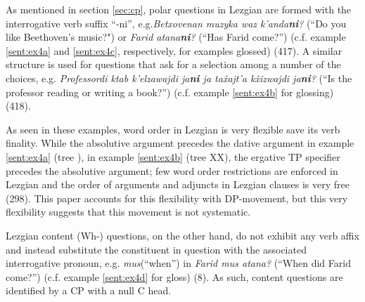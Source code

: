 As mentioned in section \ref{sec:cp}, polar questions in Lezgian are formed with the interrogative verb suffix ``-ni'', e.g.\textit{Betxovenan muzyka waz k'anda\textbf{ni}?} (``Do you like Beethoven's music?") or \textit{Farid atana\textbf{ni}?} (``Has Farid come?'') (c.f. example \ref{sent:ex4a} and \ref{sent:ex4c}, respectively, for examples glossed) (417). A similar structure is used for questions that ask for a selection among a number of the choices, e.g. \textit{Professordi ktab k'elzawajdi ja\textbf{ni} ja ta\^{x}ajt'a k\^{x}izwajdi ja\textbf{ni}?} (``Is the professor reading or writing a book?'') (c.f. example \ref{sent:ex4b} for glossing) (418).

As seen in these examples, word order in Lezgian is very flexible save its verb finality. While the absolutive argument precedes the dative argument in example \ref{sent:ex4a} (tree ), in example \ref{sent:ex4b} (tree XX), the ergative TP specifier precedes the absolutive argument; few word order restrictions are enforced in Lezgian and the order of arguments and adjuncts in Lezgian clauses is very free (298). This paper accounts for this flexibility with DP-movement, but this very flexibility suggests that this movement is not systematic. 

Lezgian content (Wh-) questions, on the other hand, do not exhibit any verb affix and instead substitute the constituent in question with the associated interrogative pronoun, e.g. \textit{mus}(``when'') in \textit{Farid mus atana?} (``When did Farid come?'') (c.f. example \ref{sent:ex4d} for gloss) (8). As such, content questions are identified by a CP with a null C head.